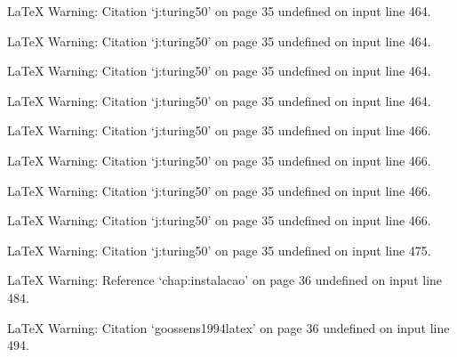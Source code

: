 LaTeX Warning: Citation `j:turing50' on page 35 undefined on input line 464.


LaTeX Warning: Citation `j:turing50' on page 35 undefined on input line 464.


LaTeX Warning: Citation `j:turing50' on page 35 undefined on input line 464.


LaTeX Warning: Citation `j:turing50' on page 35 undefined on input line 464.


LaTeX Warning: Citation `j:turing50' on page 35 undefined on input line 466.


LaTeX Warning: Citation `j:turing50' on page 35 undefined on input line 466.


LaTeX Warning: Citation `j:turing50' on page 35 undefined on input line 466.


LaTeX Warning: Citation `j:turing50' on page 35 undefined on input line 466.


LaTeX Warning: Citation `j:turing50' on page 35 undefined on input line 475.



LaTeX Warning: Reference `chap:instalacao' on page 36 undefined on input line 484.


LaTeX Warning: Citation `goossens1994latex' on page 36 undefined on input line 494.

